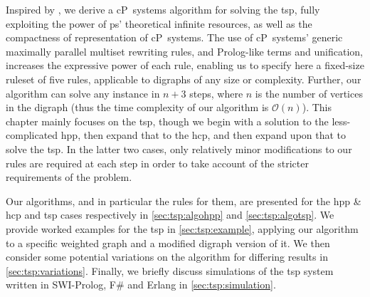 Inspired by \cite{Guo2017}, we derive a cP~systems algorithm for solving the \gls{tsp}, fully exploiting the power of \gls{ps}' theoretical infinite resources, as well as the compactness of representation of cP~systems.  The use of cP~systems' generic maximally parallel multiset rewriting rules, and Prolog-like terms and unification, increases the expressive power of each rule, enabling us to specify here a fixed-size ruleset of five rules, applicable to digraphs of any size or complexity.   Further, our algorithm can solve any instance in \(n + 3\) steps, where \(n\) is the number of vertices in the digraph (thus the time complexity of our algorithm is \(\mathcal{O}(n)\)).  This chapter mainly focuses on the \gls{tsp}, though we begin with a solution to the less-complicated \gls{hpp}, then expand that to the \gls{hcp}, and then expand upon that to solve the \gls{tsp}.  In the latter two cases, only relatively minor modifications to our rules are required at each step in order to take account of the stricter requirements of the problem.


Our algorithms, and in particular the rules for them, are presented for the \gls{hpp} \& \gls{hcp} and \gls{tsp} cases respectively in \autoref{sec:tsp:algohpp} and \autoref{sec:tsp:algotsp}.  We provide worked examples for the \gls{tsp} in \autoref{sec:tsp:example}, applying our algorithm to a specific weighted graph and a modified digraph version of it.  We then consider some potential variations on the algorithm for differing results in \autoref{sec:tsp:variations}.  Finally, we briefly discuss simulations of the \gls{tsp} system written in SWI-Prolog, F\# and Erlang in \autoref{sec:tsp:simulation}.